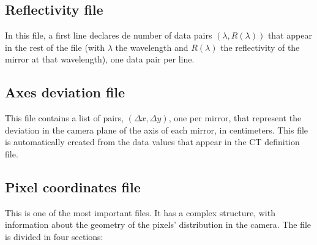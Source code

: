 \subsection{Reflectivity file}

In this file, a first line declares de number of data pairs $(\lambda,
R(\lambda))$ that appear in the rest of the file (with $\lambda$ the
wavelength and $R(\lambda)$ the reflectivity of the mirror at that
wavelength), one data pair per line.

\subsection{Axes deviation file}

This file contains a list of pairs, $(\Delta x, \Delta y)$, one per
mirror, that represent the deviation in the camera plane of the axis
of each mirror, in centimeters.  This file is automatically created
from the data values that appear in the CT definition file.

\subsection{Pixel coordinates file}

This is one of the most important files. It has a complex structure,
with information about the geometry of the pixels' distribution in the
camera. The file is divided in four sections:

